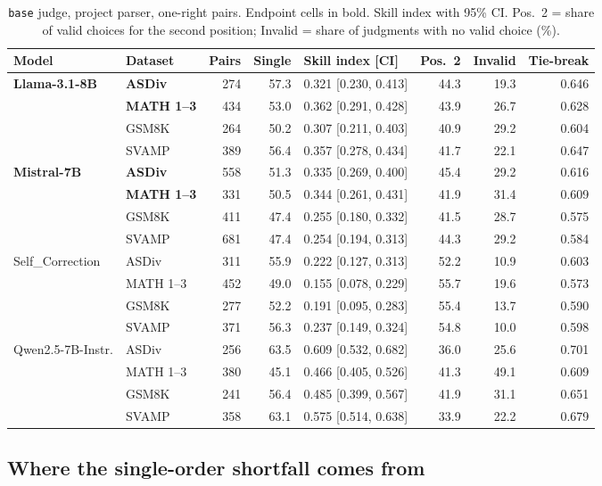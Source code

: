 \documentclass[11pt]{article}
\begin{document}
\begin{table}[t]
\centering\small
\caption{\texttt{base} judge, project parser, one-right pairs. Endpoint cells in bold. Skill index with 95\% CI.
Pos.~2 = share of valid choices for the second position; Invalid = share of judgments with no valid choice (\%).}
\label{tab:grid}
\begin{tabular}{llrrlrrr}
\toprule
Model & Dataset & Pairs & Single & Skill index [CI] & Pos.~2 & Invalid & Tie-break \\
\midrule
\textbf{Llama-3.1-8B} & \textbf{ASDiv} & 274 & 57.3 & 0.321 [0.230, 0.413] & 44.3 & 19.3 & 0.646 \\
 & \textbf{MATH 1--3} & 434 & 53.0 & 0.362 [0.291, 0.428] & 43.9 & 26.7 & 0.628 \\
 & GSM8K & 264 & 50.2 & 0.307 [0.211, 0.403] & 40.9 & 29.2 & 0.604 \\
 & SVAMP & 389 & 56.4 & 0.357 [0.278, 0.434] & 41.7 & 22.1 & 0.647 \\
\textbf{Mistral-7B} & \textbf{ASDiv} & 558 & 51.3 & 0.335 [0.269, 0.400] & 45.4 & 29.2 & 0.616 \\
 & \textbf{MATH 1--3} & 331 & 50.5 & 0.344 [0.261, 0.431] & 41.9 & 31.4 & 0.609 \\
 & GSM8K & 411 & 47.4 & 0.255 [0.180, 0.332] & 41.5 & 28.7 & 0.575 \\
 & SVAMP & 681 & 47.4 & 0.254 [0.194, 0.313] & 44.3 & 29.2 & 0.584 \\
Self\_Correction & ASDiv & 311 & 55.9 & 0.222 [0.127, 0.313] & 52.2 & 10.9 & 0.603 \\
 & MATH 1--3 & 452 & 49.0 & 0.155 [0.078, 0.229] & 55.7 & 19.6 & 0.573 \\
 & GSM8K & 277 & 52.2 & 0.191 [0.095, 0.283] & 55.4 & 13.7 & 0.590 \\
 & SVAMP & 371 & 56.3 & 0.237 [0.149, 0.324] & 54.8 & 10.0 & 0.598 \\
Qwen2.5-7B-Instr. & ASDiv & 256 & 63.5 & 0.609 [0.532, 0.682] & 36.0 & 25.6 & 0.701 \\
 & MATH 1--3 & 380 & 45.1 & 0.466 [0.405, 0.526] & 41.3 & 49.1 & 0.609 \\
 & GSM8K & 241 & 56.4 & 0.485 [0.399, 0.567] & 41.9 & 31.1 & 0.651 \\
 & SVAMP & 358 & 63.1 & 0.575 [0.514, 0.638] & 33.9 & 22.2 & 0.679 \\
\bottomrule
\end{tabular}
\end{table}

\subsection{Where the single-order shortfall comes from}\label{sec:decomp}
\end{document}
